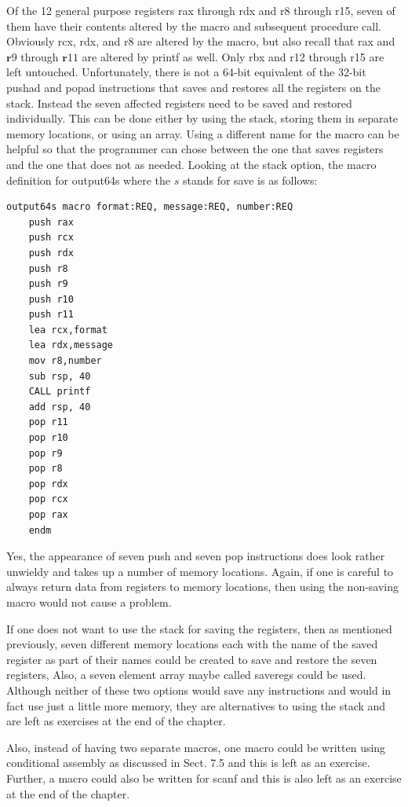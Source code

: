 \documentclass[10pt]{book}
\begin{document}
Of the 12 general purpose registers rax through rdx and r8 through r15, seven of them have their contents altered by the macro and subsequent procedure call. Obviously rcx, rdx, and r8 are altered by the macro, but also recall that rax and $\mathbf{r} 9$ through $\mathbf{r} 11$ are altered by printf as well. Only rbx and r12 through r15 are left untouched. Unfortunately, there is not a 64-bit equivalent of the 32-bit pushad and popad instructions that saves and restores all the registers on the stack. Instead the seven affected registers need to be saved and restored individually. This can be done either by using the stack, storing them in separate memory locations, or using an array. Using a different name for the macro can be helpful so that the programmer can chose between the one that saves registers and the one that does not as needed. Looking at the stack option, the macro definition for output64s where the $s$ stands for save is as follows:

\begin{verbatim}
output64s macro format:REQ, message:REQ, number:REQ
    push rax
    push rcx
    push rdx
    push r8
    push r9
    push r10
    push r11
    lea rcx,format
    lea rdx,message
    mov r8,number
    sub rsp, 40
    CALL printf
    add rsp, 40
    pop r11
    pop r10
    pop r9
    pop r8
    pop rdx
    pop rcx
    pop rax
    endm
\end{verbatim}

Yes, the appearance of seven push and seven pop instructions does look rather unwieldy and takes up a number of memory locations. Again, if one is careful to always return data from registers to memory locations, then using the non-saving macro would not cause a problem.


If one does not want to use the stack for saving the registers, then as mentioned previously, seven different memory locations each with the name of the saved register as part of their names could be created to save and restore the seven registers, Also, a seven element array maybe called saveregs could be used. Although neither of these two options would save any instructions and would in fact use just a little more memory, they are alternatives to using the stack and are left as exercises at the end of the chapter.

Also, instead of having two separate macros, one macro could be written using conditional assembly as discussed in Sect. 7.5 and this is left as an exercise. Further, a macro could also be written for scanf and this is also left as an exercise at the end of the chapter.
\end{document}
